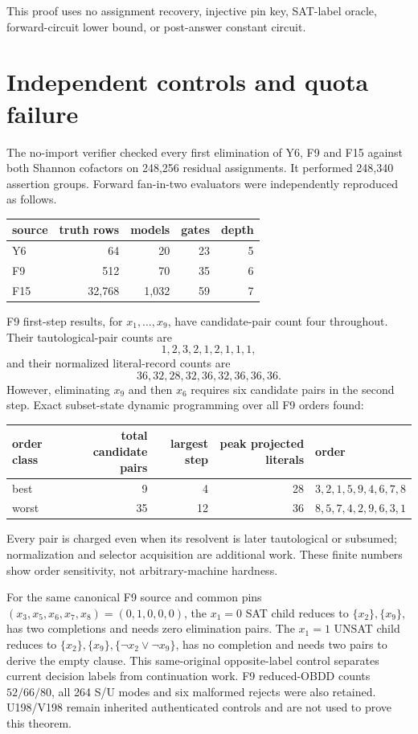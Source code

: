 \documentclass[11pt]{article}
\begin{document}
This proof uses no assignment recovery, injective pin key, SAT-label oracle,
forward-circuit lower bound, or post-answer constant circuit.

\section{Independent controls and quota failure}

The no-import verifier checked every first elimination of Y6, F9 and F15
against both Shannon cofactors on 248,256 residual assignments.  It performed
248,340 assertion groups.  Forward fan-in-two evaluators were independently
reproduced as follows.

\begin{center}
\begin{tabular}{lrrrr}
\toprule
source & truth rows & models & gates & depth\\
\midrule
Y6  & 64     & 20   & 23 & 5\\
F9  & 512    & 70   & 35 & 6\\
F15 & 32,768 & 1,032& 59 & 7\\
\bottomrule
\end{tabular}
\end{center}

F9 first-step results, for $x_1,\ldots,x_9$, have candidate-pair count four
throughout.  Their tautological-pair counts are
\[
1,2,3,2,1,2,1,1,1,
\]
and their normalized literal-record counts are
\[
36,32,28,32,36,32,36,36,36.
\]
However, eliminating $x_9$ and then $x_6$ requires six candidate pairs in
the second step.  Exact subset-state dynamic programming over all F9 orders
found:
\begin{center}
\begin{tabular}{lrrrl}
\toprule
order class & total candidate pairs & largest step & peak projected literals & order\\
\midrule
best  & 9  & 4  & 28 & $3,2,1,5,9,4,6,7,8$\\
worst & 35 & 12 & 36 & $8,5,7,4,2,9,6,3,1$\\
\bottomrule
\end{tabular}
\end{center}
Every pair is charged even when its resolvent is later tautological or
subsumed; normalization and selector acquisition are additional work.  These
finite numbers show order sensitivity, not arbitrary-machine hardness.

For the same canonical F9 source and common pins
$(x_3,x_5,x_6,x_7,x_8)=(0,1,0,0,0)$, the $x_1=0$ SAT child reduces to
$\{x_2\},\{x_9\}$, has two completions and needs zero elimination pairs.  The
$x_1=1$ UNSAT child reduces to
$\{x_2\},\{x_9\},\{\neg x_2\vee\neg x_9\}$, has no completion and needs two
pairs to derive the empty clause.  This same-original opposite-label control
separates current decision labels from continuation work.  F9 reduced-OBDD
counts $52/66/80$, all 264 S/U modes and six malformed rejects were also
retained.  U198/V198 remain inherited authenticated controls and are not used
to prove this theorem.
\end{document}
